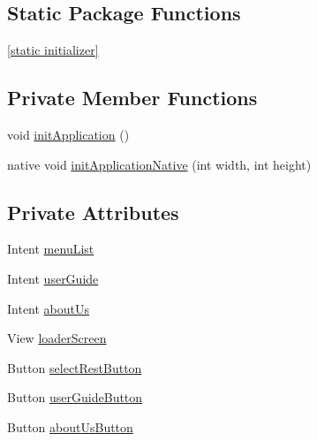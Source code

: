 \subsection*{\-Static \-Package \-Functions}
\begin{DoxyCompactItemize}
\item 
\hyperlink{classsrdes_1_1menupp_1_1menupp_ad2b34238dee7bd28287b84df8f772920}{\mbox{[}static initializer\mbox{]}}
\end{DoxyCompactItemize}
\subsection*{\-Private \-Member \-Functions}
\begin{DoxyCompactItemize}
\item 
void \hyperlink{classsrdes_1_1menupp_1_1menupp_afb469024c1cc0bb2650d87ab7a255ece}{init\-Application} ()
\item 
native void \hyperlink{classsrdes_1_1menupp_1_1menupp_a3d7013180c27a88e1feb56c95e84b902}{init\-Application\-Native} (int width, int height)
\end{DoxyCompactItemize}
\subsection*{\-Private \-Attributes}
\begin{DoxyCompactItemize}
\item 
\-Intent \hyperlink{classsrdes_1_1menupp_1_1menupp_a5d63ba3dde9f3b6bea5c338eb1bb7aee}{menu\-List}
\item 
\-Intent \hyperlink{classsrdes_1_1menupp_1_1menupp_aef8f3af7461fe00e6bcb9cb9f05f517f}{user\-Guide}
\item 
\-Intent \hyperlink{classsrdes_1_1menupp_1_1menupp_ae77c4ec530ea5b9eff053fcec4178422}{about\-Us}
\item 
\-View \hyperlink{classsrdes_1_1menupp_1_1menupp_a4edeee064c9ac2fbc1e39ea581f44ffd}{loader\-Screen}
\item 
\-Button \hyperlink{classsrdes_1_1menupp_1_1menupp_a5c2183b453845f3930d2b54cf26e4766}{select\-Rest\-Button}
\item 
\-Button \hyperlink{classsrdes_1_1menupp_1_1menupp_a8d1983c2ff0ce887838e2019744d43bf}{user\-Guide\-Button}
\item 
\-Button \hyperlink{classsrdes_1_1menupp_1_1menupp_aadaa050e4f9286f6f60c0dcb867815ec}{about\-Us\-Button}
\end{DoxyCompactItemize}
